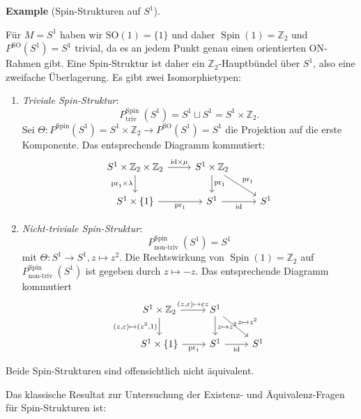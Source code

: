 \documentclass[10pt, letterpaper]{article}
\newcommand{\CustomHeading}[3]{%
  \par\medskip\noindent%
  \textbf{#1 #2} \textnormal{(#3)}.\enskip%
}
\newenvironment{EXA}[2]{\CustomHeading{Example}{#1}{#2}}{}
\begin{document}
\begin{EXA}{}{Spin-Strukturen auf $S^1$}
Für $M=S^1$ haben wir $\mathrm{SO}(1)=\{1\}$ und daher $\operatorname{Spin}(1)=\mathbb{Z}_2$ und $P^{\mathrm{SO}}\left(S^1\right)=S^1$ trivial, da es an jedem Punkt genau einen orientierten ON-Rahmen gibt. Eine Spin-Struktur ist daher ein $\mathbb{Z}_2$-Hauptbündel über $S^1$, also eine zweifache Überlagerung. Es gibt zwei Isomorphietypen:
\begin{enumerate}
    \item \emph{Triviale Spin-Struktur}:
    $$
    P_{\text {triv }}^{\text {Spin }}\left(S^1\right)=S^1 \sqcup S^1=S^1 \times \mathbb{Z}_2 .
    $$
    Sei $\Theta: P^{\operatorname{Spin}}\left(S^1\right)=S^1 \times \mathbb{Z}_2 \rightarrow P^{\mathrm{SO}}\left(S^1\right)=S^1$ die Projektion auf die erste Komponente. Das entsprechende Diagramm kommutiert:
    $$\begin{tikzcd}
    S^1 \times \mathbb{Z}_2 \times \mathbb{Z}_2 
    \arrow[r, "{\mathrm{id} \times \mu}"] 
    \arrow[d, "{\mathrm{pr}_1 \times \lambda}"'] 
    & S^1 \times \mathbb{Z}_2 
    \arrow[d, "{\mathrm{pr}_1}"] 
    \arrow[dr, "{\mathrm{pr}_1}"] \\
    S^1 \times \{1\} 
    \arrow[r, "{\mathrm{pr}_1}"'] 
    & S^1 
    \arrow[r, "\mathrm{id}"'] 
    & S^1
    \end{tikzcd}$$
    
    \item \emph{Nicht-triviale Spin-Struktur}:
    $$P_{\text {non-triv }}^{\text {Spin }}\left(S^1\right)=S^1$$ 
    mit $\Theta: S^1 \rightarrow S^1, z \mapsto z^2$. Die Rechtswirkung von $\operatorname{Spin}(1)=\mathbb{Z}_2$ auf $P_{\text {non-triv }}^{\text {Spin }}\left(S^1\right)$ ist gegeben durch $z \mapsto-z$. Das entsprechende Diagramm kommutiert
    $$\begin{tikzcd}
    S^1 \times \mathbb{Z}_2 
    \arrow[r, "{(z,\varepsilon)\mapsto \varepsilon z}"] 
    \arrow[d, "{(z,\varepsilon)\mapsto (z^2,1)}"'] 
    & S^1 
    \arrow[d, "{z\mapsto z^2}"] 
    \arrow[dr, "{z\mapsto z^2}"] \\
    S^1 \times \{1\} 
    \arrow[r, "{\mathrm{pr}_1}"'] 
    & S^1 
    \arrow[r, "\mathrm{id}"'] 
    & S^1
    \end{tikzcd}$$
\end{enumerate}
Beide Spin-Strukturen sind offensichtlich nicht äquivalent.
\end{EXA}

\bigskip 

Das klassische Resultat zur Untersuchung der Existenz- und Äquivalenz-Fragen für Spin-Strukturen ist:
\end{document}
